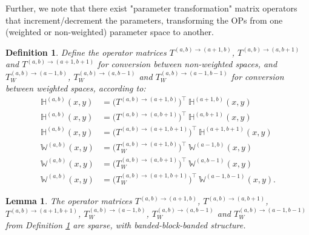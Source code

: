 \documentclass[11pt, oneside]{article}   	%
\newcommand{\hdop}{H}
\newcommand{\bighdop}{\mathbb{\hdop}}
\newcommand{\bigW}{\mathbb{W}}
\newtheorem{lemma}{Lemma}
\newtheorem{definition}{Definition}
\begin{document}
Further, we note that there exist "parameter transformation" matrix operators that increment/decrement the parameters, transforming the OPs from one (weighted or non-weighted) parameter space to another. 
\begin{definition}\label{def:parametertransformationoperators}
Define the operator matrices $T^{(a,b)\to(a+1,b)}$, $T^{(a,b)\to(a,b+1)}$ and $T^{(a,b)\to(a+1,b+1)}$ for conversion between non-weighted spaces, and $T_W^{(a,b)\to(a-1,b)}$, $T_W^{(a,b)\to(a,b-1)}$ and $T_W^{(a,b)\to(a-1,b-1)}$ for conversion between weighted spaces, according to:
\begin{align*}
	\bighdop^{(a,b)}(x,y) &= \Big(T^{(a,b)\to(a+1,b)} \Big)^\top \: \bighdop^{(a+1,b)}(x,y) \\
	\bighdop^{(a,b)}(x,y) &= \Big(T^{(a,b)\to(a,b+1)} \Big)^\top \: \bighdop^{(a,b+1)}(x,y) \\
	\bighdop^{(a,b)}(x,y) &= \Big(T^{(a,b)\to(a+1,b+1)} \Big)^\top \: \bighdop^{(a+1,b+1)}(x,y) \\
	\bigW^{(a,b)}(x,y) &= \Big(T_W^{(a,b)\to(a+1,b)} \Big)^\top \: \bigW^{(a-1,b)}(x,y) \\
	\bigW^{(a,b)}(x,y) &= \Big(T_W^{(a,b)\to(a,b+1)} \Big)^\top \: \bigW^{(a,b-1)}(x,y) \\
	\bigW^{(a,b)}(x,y) &= \Big(T_W^{(a,b)\to(a+1,b+1)} \Big)^\top \: \bigW^{(a-1,b-1)}(x,y).
\end{align*}
\end{definition}

\begin{lemma}\label{lemma:sparsityofparametertransformationoperators}
The operator matrices $T^{(a,b)\to(a+1,b)}$, $T^{(a,b)\to(a,b+1)}$, $T^{(a,b)\to(a+1,b+1)}$, $T_W^{(a,b)\to(a-1,b)}$, $T_W^{(a,b)\to(a,b-1)}$ and $T_W^{(a,b)\to(a-1,b-1)}$ from Definition \ref{def:parametertransformationoperators} are sparse, with banded-block-banded structure.
\end{lemma}
\end{document}
